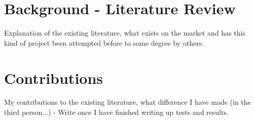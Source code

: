 \documentclass[../main.tex]{subfiles}
\begin{document}
\section{Background - Literature Review} \label{sec_Lit Review}

Explanation of the existing literature, what exists on the market and has this kind of project been attempted before to some degree by others.



\section{Contributions}

My contributions to the existing literature, what difference I have made (in the third person...) - Write once I have finished writing up tests and results.
\end{document}
